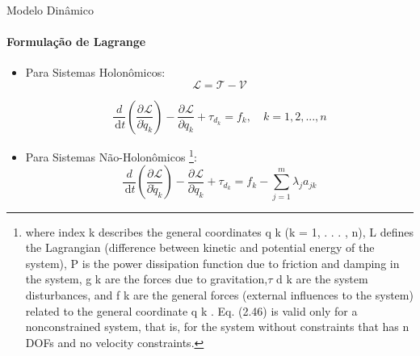 \documentclass{beamer}
\newcommand{\df}[1]{\,\mathrm{d}#1}
\newcommand{\parcial}[3]{\dfrac{\partial^{#1}#2}{\partial #3^{#1}}}
\begin{document}
\begin{frame}{Modelo Dinâmico}
    \framesubtitle{Formulação de Lagrange}
   
    \begin{itemize}
        \item Para Sistemas Holonômicos:
        \begin{equation}
            \mathcal{L}= \mathcal{T} - \mathcal{V}
        \end{equation}

        \begin{equation}
            \frac{d}{\df{t}}\left( \parcial{}{\mathcal{L}}{\dot{q}_k}\right)
            -\parcial{}{\mathcal{L}}{q_k}
            +\tau_{d_k}
            = f_k, \quad k = 1,2,...,n
        \end{equation}

        \item Para Sistemas Não-Holonômicos \footnote{where index k describes the general coordinates q k (k = 1, . . . , n), L
        defines the Lagrangian (difference between kinetic and potential energy
        of the system), P is the power dissipation function due to friction and
        damping in the system, g k are the forces due to gravitation,$\tau$ d k are the
        system disturbances, and f k are the general forces (external influences to the
        system) related to the general coordinate q k . Eq. (2.46) is valid only for a
        nonconstrained system, that is, for the system without constraints that has n
        DOFs and no velocity constraints.}:
        \begin{equation}
            \frac{d}{\df{t}}\left( \parcial{}{\mathcal{L}}{\dot{q}_k}\right)
            -\parcial{}{\mathcal{L}}{q_k}
            +\tau_{d_k}
            = f_k - \sum\limits^{m}_{j=1}\lambda_j a_{jk} 
        \end{equation}
    \end{itemize}   
\end{frame}
\end{document}
